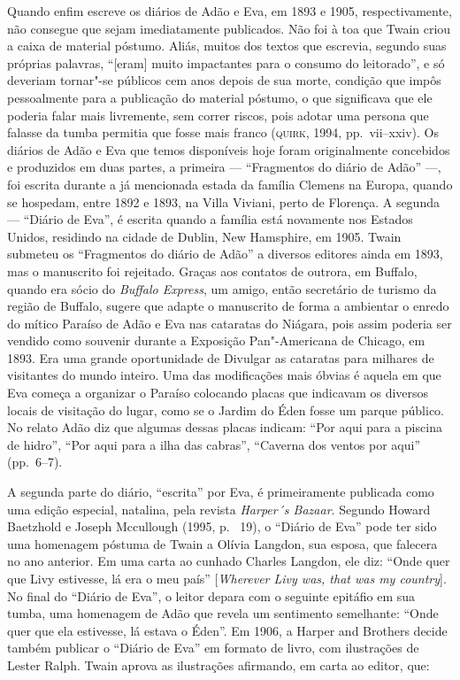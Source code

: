 Quando enfim escreve os diários de Adão e Eva, em 1893 e 1905,
respectivamente, não consegue que sejam imediatamente publicados. Não foi à toa
que Twain criou a caixa de material póstumo. Aliás, muitos dos textos que
escrevia, segundo suas próprias palavras, ``[eram] muito
impactantes para o consumo do leitorado'', e só deveriam
tornar"-se públicos cem anos depois de sua morte, condição que impôs
pessoalmente para a publicação do material póstumo, o que significava que ele
poderia falar mais livremente, sem correr riscos, pois adotar uma
persona que falasse da tumba permitia que fosse mais franco (\textsc{quirk},
1994, pp.~vii--xxiv). Os diários de Adão e Eva que temos disponíveis
hoje foram originalmente concebidos e produzidos em duas partes, a
primeira --- ``Fragmentos do diário de Adão'' ---, foi escrita durante a
já mencionada estada da família Clemens na Europa, quando se
hospedam, entre 1892 e 1893, na Villa Viviani, perto de Florença. A segunda
--- ``Diário de Eva'', é escrita quando a família está novamente nos Estados
Unidos, residindo na cidade de Dublin, New Hamsphire, em 1905. Twain submeteu os
``Fragmentos do diário de Adão'' a diversos editores ainda em 1893, mas o
manuscrito foi rejeitado. Graças aos contatos de outrora, em Buffalo, quando
era sócio do \textit{Buffalo Express}, um amigo, então secretário de turismo da
região de Buffalo, sugere que adapte o manuscrito de forma a ambientar o
enredo do mítico Paraíso de Adão e Eva nas cataratas do Niágara, pois
assim poderia ser vendido como souvenir durante a Exposição
Pan"-Americana de Chicago, em 1893. Era uma grande oportunidade de
Divulgar as cataratas para milhares de visitantes do mundo inteiro. Uma das
modificações mais óbvias é aquela em que Eva começa a organizar o Paraíso
colocando placas que indicavam os diversos locais de visitação do lugar,
como se o Jardim do Éden fosse um parque público. No relato Adão diz
que algumas dessas placas indicam: “Por aqui para a piscina de
hidro”, “Por aqui para a ilha das cabras”, “Caverna dos ventos por aqui”
(pp.~6--7).

A segunda parte do diário, ``escrita'' por Eva, é
primeiramente publicada como uma edição especial, natalina, pela revista
\textit{Harper´s Bazaar}. Segundo Howard Baetzhold e Joseph Mccullough (1995, p.~
19), o ``Diário de Eva'' pode ter sido uma homenagem póstuma de Twain a Olívia
Langdon, sua esposa, que falecera no ano anterior. Em uma carta ao
cunhado Charles Langdon, ele diz: ``Onde quer que Livy estivesse,
lá era o meu país'' [\textit{Wherever Livy was, that was my country}].
No final do ``Diário de Eva'', o leitor depara com o seguinte
epitáfio em sua tumba, uma homenagem de Adão que revela um sentimento semelhante:
``Onde quer que ela estivesse, lá estava o Éden''. Em 1906, a     
Harper and Brothers decide também publicar o “Diário de Eva” em formato de
livro, com ilustrações de Lester Ralph. Twain aprova as ilustrações
afirmando, em carta ao editor, que:

